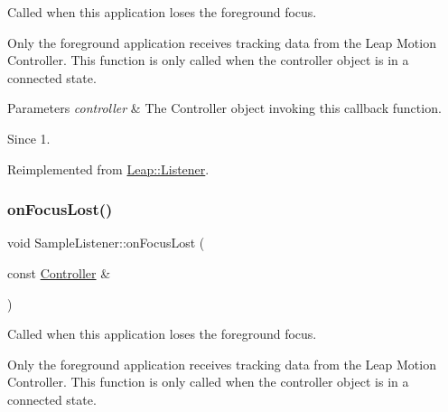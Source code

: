 Called when this application loses the foreground focus.

Only the foreground application receives tracking data from the Leap Motion Controller. This function is only called when the controller object is in a connected state.


\begin{DoxyCodeInclude}
\end{DoxyCodeInclude}



\begin{DoxyParams}{Parameters}
{\em controller} & The Controller object invoking this callback function. \\
\hline
\end{DoxyParams}
\begin{DoxySince}{Since}
1. 
\end{DoxySince}


Reimplemented from \hyperlink{class_leap_1_1_listener_a7bcae44a40674c3f1e367b911201d252}{Leap\+::\+Listener}.

\mbox{\label{class_sample_listener_a3b245f2961cec0c592ebdfaf797d6365}} 
\subsubsection{\texorpdfstring{on\+Focus\+Lost()}{onFocusLost()}\hspace{0.1cm}{\footnotesize\ttfamily [2/2]}}
{\footnotesize\ttfamily void Sample\+Listener\+::on\+Focus\+Lost (\begin{DoxyParamCaption}\item[{const \hyperlink{class_leap_1_1_controller}{Controller} \&}]{ }\end{DoxyParamCaption})\hspace{0.3cm}{\ttfamily [virtual]}}

Called when this application loses the foreground focus.

Only the foreground application receives tracking data from the Leap Motion Controller. This function is only called when the controller object is in a connected state.


\begin{DoxyCodeInclude}
\end{DoxyCodeInclude}



